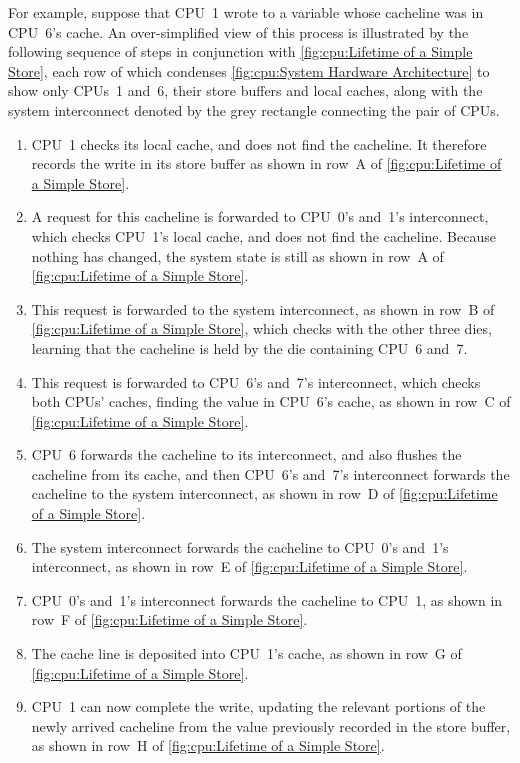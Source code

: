 For example, suppose that CPU~1 wrote to a variable  whose cacheline
was in CPU~6's cache.
An over-simplified view of this process is illustrated by the following
sequence of steps in conjunction with
\cref{fig:cpu:Lifetime of a Simple Store},
each row of which condenses
\cref{fig:cpu:System Hardware Architecture}
to show only CPUs~1 and~6, their store buffers and local caches, along
with the system interconnect denoted by the grey rectangle connecting
the pair of CPUs.

\begin{enumerate}
\item	CPU~1 checks its local cache, and does not find the cacheline.
	It therefore records the write in its store buffer as shown
	in row~A of
	\cref{fig:cpu:Lifetime of a Simple Store}.
\item	A request for this cacheline is forwarded to CPU~0's and~1's
	interconnect, which checks CPU~1's local cache, and does not
	find the cacheline.
	Because nothing has changed, the system state is still as shown
	in row~A of
	\cref{fig:cpu:Lifetime of a Simple Store}.
\item	This request is forwarded to the system interconnect, as shown
	in row~B of
	\cref{fig:cpu:Lifetime of a Simple Store},
	which checks with the other three dies, learning that the
	cacheline is held by the die containing CPU~6 and~7.
\item	This request is forwarded to CPU~6's and~7's interconnect, which
	checks both CPUs' caches, finding the value in CPU~6's cache,
	as shown in row~C of
	\cref{fig:cpu:Lifetime of a Simple Store}.
\item	CPU~6 forwards the cacheline to its interconnect, and also
	flushes the cacheline from its cache, and then
	CPU~6's and~7's interconnect forwards the cacheline to the
	system interconnect, as shown in row~D of
	\cref{fig:cpu:Lifetime of a Simple Store}.
\item	The system interconnect forwards the cacheline to CPU~0's and~1's
	interconnect, as shown in row~E of
	\cref{fig:cpu:Lifetime of a Simple Store}.
\item	CPU~0's and~1's interconnect forwards the cacheline to CPU~1,
	as shown in row~F of
	\cref{fig:cpu:Lifetime of a Simple Store}.
\item	The cache line is deposited into CPU~1's cache, as shown in
	row~G of
	\cref{fig:cpu:Lifetime of a Simple Store}.
\item	CPU~1 can now complete the write, updating the relevant portions
	of the newly arrived cacheline from the value previously
	recorded in the store buffer, as shown in row~H of
	\cref{fig:cpu:Lifetime of a Simple Store}.
\end{enumerate}

